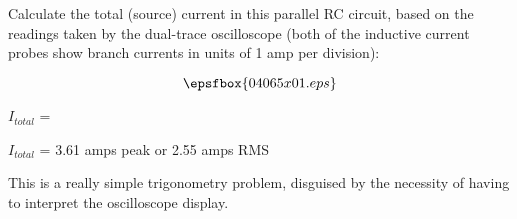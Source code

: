 

Calculate the total (source) current in this parallel RC circuit, based on the readings taken by the dual-trace oscilloscope (both of the inductive current probes show branch currents in units of 1 amp per division):

$$\epsfbox{04065x01.eps}$$

$I_{total}$ =

\vskip 10pt







$I_{total}$ = 3.61 amps peak or 2.55 amps RMS







This is a really simple trigonometry problem, disguised by the necessity of having to interpret the oscilloscope display.





